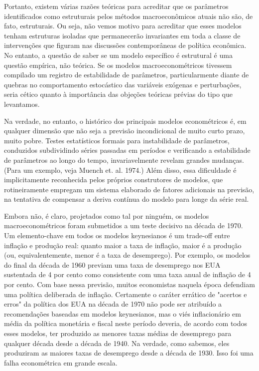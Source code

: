 \documentclass[12pt]{article}
\begin{document}
Portanto, existem várias razões teóricas para acreditar que os parâmetros identificados como estruturais pelos métodos macroeconômicos atuais não são, de fato, estruturais. Ou seja, não vemos motivo para acreditar que esses modelos tenham estruturas isoladas que permanecerão invariantes em toda a classe de intervenções que figuram nas discussões contemporâneas de política econômica. No entanto, a questão de saber se um modelo específico é estrutural é uma questão empírica, não teórica. Se os modelos macroeconométricos tivessem compilado um registro de estabilidade de parâmetros, particularmente diante de quebras no comportamento estocástico das variáveis exógenas e perturbações, seria cético quanto à importância das objeções teóricas prévias do tipo que levantamos.

Na verdade, no entanto, o histórico dos principais modelos econométricos é, em qualquer dimensão que não seja a previsão incondicional de muito curto prazo, muito pobre. Testes estatísticos formais para instabilidade de parâmetros, conduzidos subdividindo séries passadas em períodos e verificando a estabilidade de parâmetros ao longo do tempo, invariavelmente revelam grandes mudanças. (Para um exemplo, veja Muench et. al. 1974.) Além disso, essa dificuldade é implicitamente reconhecida pelos próprios construtores de modelos, que rotineiramente empregam um sistema elaborado de fatores adicionais na previsão, na tentativa de compensar a deriva contínua do modelo para longe da série real.

Embora não, é claro, projetados como tal por ninguém, os modelos macroeconométricos foram submetidos a um teste decisivo na década de 1970. Um elemento-chave em todos os modelos keynesianos é um trade-off entre inflação e produção real: quanto maior a taxa de inflação, maior é a produção (ou, equivalentemente, menor é a taxa de desemprego). Por exemplo, os modelos do final da década de 1960 previam uma taxa de desemprego nos EUA sustentada de 4 por cento como consistente com uma taxa anual de inflação de 4 por cento. Com base nessa previsão, muitos economistas naquela época defendiam uma política deliberada de inflação. Certamente o caráter errático de "acertos e erros" da política dos EUA na década de 1970 não pode ser atribuído a recomendações baseadas em modelos keynesianos, mas o viés inflacionário em média da política monetária e fiscal neste período deveria, de acordo com todos esses modelos, ter produzido as menores taxas médias de desemprego para qualquer década desde a década de 1940. Na verdade, como sabemos, eles produziram as maiores taxas de desemprego desde a década de 1930. Isso foi uma falha econométrica em grande escala.
\end{document}
